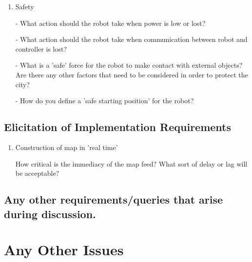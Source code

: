 \documentclass[11pt, a4paper]{article}
\begin{document}
\begin{enumerate}
\item Safety

- What action should the robot take when power is low or lost?

\vspace*{10pt}

- What action should the robot take when communication between robot and controller is lost?

\vspace*{10pt}

- What is a 'safe' force for the robot to make contact with external objects? Are there any other factors that need to be considered in order to protect the city?

\vspace*{10pt}

- How do you define a 'safe starting position' for the robot?

\vspace*{10pt}

\end{enumerate}


\subsection{Elicitation of Implementation Requirements}

\begin{enumerate}

\item Construction of map in 'real time'

\vspace*{10pt}

How critical is the immediacy of the map feed? What sort of delay or lag will be acceptable?

\vspace*{10pt}

\end{enumerate}

\subsection{Any other requirements/queries that arise during discussion.}

\vspace*{10pt}

\section{Any Other Issues}
\end{document}
